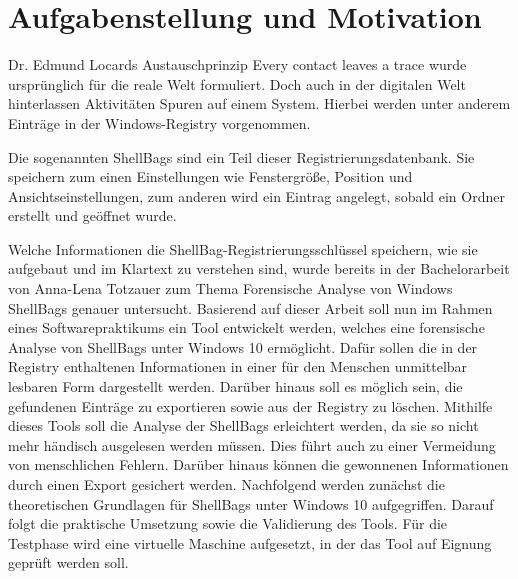 \section{Aufgabenstellung und Motivation}

Dr. Edmund Locards Austauschprinzip \glqq Every contact leaves a trace\grqq{} wurde ursprünglich für die reale Welt formuliert. Doch auch in der digitalen Welt hinterlassen Aktivitäten Spuren auf einem System. Hierbei werden unter anderem Einträge in der Windows-Registry vorgenommen. \cite[S.5]{carvey2011windows} 

Die sogenannten ShellBags sind ein Teil dieser Registrierungsdatenbank. Sie speichern zum einen Einstellungen wie Fenstergröße, Position und Ansichtseinstellungen, zum anderen wird ein Eintrag angelegt, sobald ein Ordner erstellt und geöffnet wurde. \cite[S.26]{kavrestad2018fundamentals} 

Welche Informationen die ShellBag-Registrierungsschlüssel speichern, wie sie aufgebaut und im Klartext zu verstehen sind, wurde bereits in der Bachelorarbeit von Anna-Lena Totzauer zum Thema \glqq Forensische Analyse von Windows ShellBags\grqq{} genauer untersucht. Basierend auf dieser Arbeit soll nun im Rahmen eines Softwarepraktikums ein Tool entwickelt werden, welches eine forensische Analyse von ShellBags unter Windows 10 ermöglicht. Dafür sollen die in der Registry enthaltenen Informationen in einer für den Menschen unmittelbar lesbaren Form dargestellt werden. Darüber hinaus soll es möglich sein, die gefundenen Einträge zu exportieren sowie aus der Registry zu löschen. Mithilfe dieses Tools soll die Analyse der ShellBags erleichtert werden, da sie so nicht mehr händisch ausgelesen werden müssen. Dies führt auch zu einer Vermeidung von menschlichen Fehlern.  Darüber hinaus können die gewonnenen Informationen durch einen Export gesichert werden. \newline
Nachfolgend werden zunächst die theoretischen Grundlagen für ShellBags unter Windows 10 aufgegriffen. Darauf folgt die praktische Umsetzung sowie die Validierung des Tools. Für die Testphase wird eine virtuelle Maschine aufgesetzt, in der das Tool auf Eignung geprüft werden soll. 

